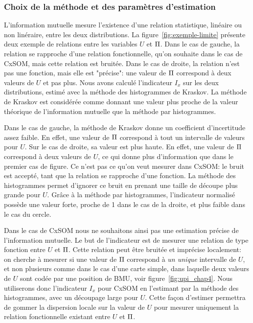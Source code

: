 \subsubsection{Choix de la méthode et des paramètres d'estimation}

L'information mutuelle mesure l'existence d'une relation statistique, linéaire ou non linéraire, entre les deux distributions. La figure~\ref{fig:exemple-limite} présente deux exemple de relations entre les variables $U$ et $\Pi$.
Dans le cas de gauche, la relation se rapproche d'une relation fonctionnelle, qu'on souhaite dans le cas de CxSOM, mais cette relation est bruitée. Dans le cas de droite, la relation n'est pas une fonction, mais elle est "précise": une valeur de $\Pi$ correspond à deux valeurs de $U$ et pas plus.
Nous avons calculé l'indicateur $I_x$ sur les deux distributions, estimé avec la méthode des histogrammes de Kraskov. La méthode de Kraskov est considérée comme donnant une valeur plus proche de la valeur théorique de l'information mutuelle que la méthode par histogrammes. 

Dans le cas de gauche, la méthode de Kraskov donne un coefficient d'incertitude assez faible. En effet, une valeur de $\Pi$ correspond à tout un intervalle de valeurs pour $U$. Sur le cas de droite, sa valeur est plus haute. En effet, une valeur de $\Pi$ correspond à deux valeurs de $U$, ce qui donne plus d'information que dans le premier cas de figure. Ce n'est pas ce qu'on veut mesurer dans CxSOM: le bruit est accepté, tant que la relation se rapproche d'une fonction.
La méthode des histogrammes permet d'ignorer ce bruit en prenant une taille de découpe plus grande pour $U$. Grâce à la méthode par histogrammes, l'indicateur normalisé possède une valeur forte, proche de 1 dans le cas de la droite, et plus faible dans le cas du cercle.

Dans le cas de CxSOM nous ne souhaitons ainsi pas une estimation précise de l'information mutuelle.
Le but de l'indicateur est de mesurer une relation de type fonction entre $U$ et $\Pi$.
Cette relation peut être bruitée et imprécise localement: on cherche à mesurer si une valeur de $\Pi$ correspond à \emph{un unique} intervalle de $U$, et non plusieurs comme dans le cas d'une carte simple, dans laquelle deux valeurs de $U$ sont codée par une position de BMU, voir figure~\ref{fig:upi_chap4}.
Nous utiliserons donc l'indicateur $I_x$ pour CxSOM en l'estimant par la méthode des histogrammes, avec un découpage large pour $U$. Cette façon d'estimer permettra de gommer la dispersion locale sur la valeur de $U$ pour mesurer uniquement la relation fonctionnelle existant entre $U$ et $\Pi$.


